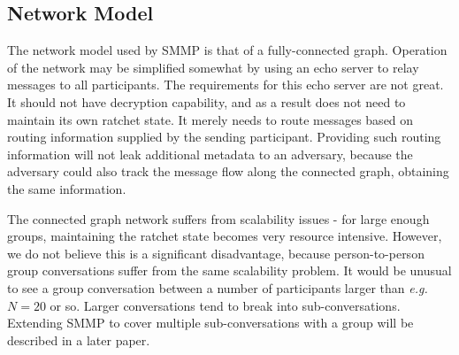\documentclass[%
preprint,
amsmath,amssymb,
aps,
prb,
floatfix,
]{revtex4-1}
\begin{document}
\subsection{\label{sec:networkmodel}Network Model}
The network model used by SMMP is that of a fully-connected graph.
Operation of the network may be simplified somewhat by using an echo server to
relay messages to all participants. The requirements for this echo server are
not great. It should not have decryption capability, and as a result does not
need to maintain its own ratchet state. It merely needs to route messages based
on routing information supplied by the sending participant. Providing such routing
information will not leak additional metadata to an adversary, because the
adversary could also track the message flow along the connected graph, obtaining
the same information.

The connected graph network suffers from scalability issues - for large enough
groups, maintaining the ratchet state becomes very resource intensive. However,
we do not believe this is a significant disadvantage, because person-to-person
group conversations suffer from the same scalability problem. It  would be
unusual to see a group conversation between a number of participants larger
than \textit{e.g.} $N = 20$ or so. Larger conversations tend to break into
sub-conversations.
Extending SMMP to cover multiple sub-conversations with a group will be
described in a later paper.
\end{document}
